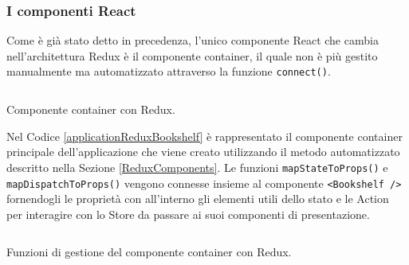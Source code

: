 \subsubsection*{I componenti React}
Come è già stato detto in precedenza, l'unico componente React che cambia nell'architettura Redux è il componente container, il quale non è più gestito manualmente ma automatizzato attraverso la funzione \texttt{connect()}.

\begin{listing}[ht]
\inputminted{javascript}{sources/applicationReduxBookshelf.js}
\caption{Componente container con Redux.} 
\label{applicationReduxBookshelf} 
\end{listing}

Nel Codice \ref{applicationReduxBookshelf} è rappresentato il componente container principale dell'applicazione che viene creato utilizzando il metodo automatizzato descritto nella Sezione \ref{ReduxComponents}. Le funzioni \texttt{mapStateToProps()} e \texttt{mapDispatchToProps()} vengono connesse insieme al componente \texttt{<Bookshelf />} fornendogli le proprietà con all'interno gli elementi utili dello stato e le Action per interagire con lo Store da passare ai suoi componenti di presentazione.

\begin{listing}[ht]
\inputminted{javascript}{sources/applicationReduxBookshelfProps.js}
\caption{Funzioni di gestione del componente container con Redux.} 
\label{applicationReduxBookshelfProps} 
\end{listing} 

